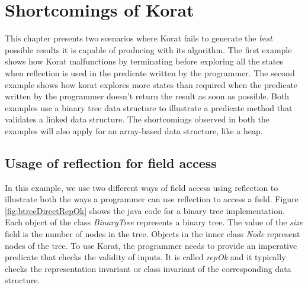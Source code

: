 \chapter{Shortcomings of Korat}
This chapter presents two scenarios where Korat\cite{boyapati2002korat} fails to generate the \emph{best} possible results it is capable of producing with its algorithm. The first example shows how Korat malfunctions by terminating before exploring all the states when reflection is used in the predicate written by the programmer. The second example shows how korat explores more states than required when the predicate written by the programmer doesn’t return the result as soon as possible. Both examples use a binary tree data structure to illustrate a predicate method that validates a linked data structure. The shortcomings observed in both the examples will also apply for an array-based data structure, like a heap.

\section{Usage of reflection for field access}
In this example, we use two different ways of field access using reflection to illustrate both the ways a programmer can use reflection to access a field. Figure \ref{fig:btreeDirectRepOk} shows the java code for a binary tree implementation. Each object of the class \emph{BinaryTree} represents a binary tree. The value of the \emph{size} field is the number of nodes in the tree. Objects in the inner class \emph{Node} represent nodes of the tree. To use Korat, the programmer needs to provide an imperative predicate that checks the validity of inputs. It is called \emph{repOk} and it typically checks the representation invariant or class invariant of the corresponding data structure. \\


